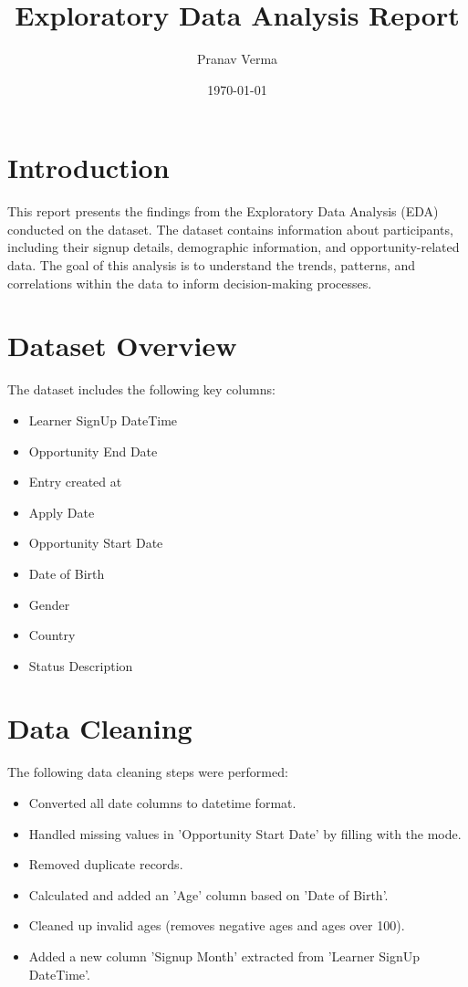 \documentclass{article}
\title{Exploratory Data Analysis Report}
\author{Pranav Verma}
\date{\today}
\begin{document}
\maketitle

\section{Introduction}
This report presents the findings from the Exploratory Data Analysis (EDA) conducted on the dataset. The dataset contains information about participants, including their signup details, demographic information, and opportunity-related data. The goal of this analysis is to understand the trends, patterns, and correlations within the data to inform decision-making processes.

\section{Dataset Overview}
The dataset includes the following key columns:
\begin{itemize}
    \item Learner SignUp DateTime
    \item Opportunity End Date
    \item Entry created at
    \item Apply Date
    \item Opportunity Start Date
    \item Date of Birth
    \item Gender
    \item Country
    \item Status Description
\end{itemize}

\section{Data Cleaning}
The following data cleaning steps were performed:
\begin{itemize}
    \item Converted all date columns to datetime format.
    \item Handled missing values in 'Opportunity Start Date' by filling with the mode.
    \item Removed duplicate records.
    \item Calculated and added an 'Age' column based on 'Date of Birth'.
    \item Cleaned up invalid ages (removes negative ages and ages over 100).
    \item Added a new column 'Signup Month' extracted from 'Learner SignUp DateTime'.
\end{itemize}
\end{document}
